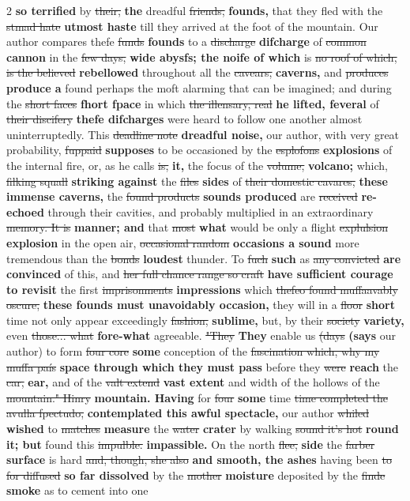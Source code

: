 \documentclass[10pt]{article}
\begin{document}
\begin{multicols}{2}
\textbf{so terrified} by \sout{their,} \textbf{the} dreadful \sout{friends,} \textbf{founds,} that they fled with the \sout{stmad hate} \textbf{utmost haste} till they arrived at the foot of the mountain. Our author compares thefe \sout{funds} \textbf{founds} to a \sout{discharge} \textbf{difcharge} of \sout{common} \textbf{cannon} in the \sout{few days,} \textbf{wide abysfs; the noife of which} is \sout{no roof of which, is the believed} \textbf{rebellowed} throughout all the \sout{cavears,} \textbf{caverns,} and \sout{produces} \textbf{produce a} found perhaps the moft alarming that can be imagined; and during the \sout{short faces} \textbf{fhort fpace} in which \sout{the illensary, real} \textbf{he lifted, feveral} of \sout{their discifery} \textbf{thefe difcharges} were heard to follow one another almost uninterruptedly. This \sout{deadline note} \textbf{dreadful noise,} our author, with very great probability, \sout{fuppaid} \textbf{supposes} to be occasioned by the \sout{esplofons} \textbf{explosions} of the internal fire, or, as he calls \sout{is,} \textbf{it,} the focus of the \sout{volume,} \textbf{volcano;} which, \sout{filking squall} \textbf{striking against} the \sout{files} \textbf{sides} of \sout{their domestic cavares,} \textbf{these immense caverns,} the \sout{found products} \textbf{sounds produced} are \sout{received} \textbf{re-echoed} through their cavities, and probably multiplied in an extraordinary \sout{memory. It is} \textbf{manner; and} that \sout{most} \textbf{what} would be only a flight \sout{explulsion} \textbf{explosion} in the open air, \sout{occasional random} \textbf{occasions a sound} more tremendous than the \sout{bonds} \textbf{loudest} thunder. To \sout{fuch} \textbf{such} as \sout{any convicted} \textbf{are convinced} of this, and \sout{her full chance range so craft} \textbf{have sufficient courage to revisit} the first \sout{imprisonments} \textbf{impressions} which \sout{thefeo found muffaavably oscure,} \textbf{these founds must unavoidably occasion,} they will in a \sout{floor} \textbf{short} time not only appear exceedingly \sout{fashion,} \textbf{sublime,} but, by their \sout{society} \textbf{variety,} even \sout{those... what} \textbf{fore-what} agreeable. \sout{"They} \textbf{They} enable us \sout{(days} \textbf{(says} our author) to form \sout{four core} \textbf{some} conception of the \sout{fascination which, why my muffa país} \textbf{space through which they must pass} before they \sout{were} \textbf{reach} the \sout{car,} \textbf{ear,} and of the \sout{valt extend} \textbf{vast extent} and width of the hollows of the \sout{mountain." Hinry} \textbf{mountain. Having} for \sout{four} \textbf{some} time \sout{time completed the avulla fpectudo,} \textbf{contemplated this awful spectacle,} our author \sout{whiled} \textbf{wished} to \sout{matches} \textbf{measure} the \sout{water} \textbf{crater} by walking \sout{sound it’s hot} \textbf{round it; but} found this \sout{impulble.} \textbf{impassible.} On the north \sout{flee,} \textbf{side} the \sout{farber} \textbf{surface} is hard \sout{and, though, she also} \textbf{and smooth, the ashes} having been \sout{to for diffused} \textbf{so far dissolved} by the \sout{mother} \textbf{moisture} deposited by the \sout{finde} \textbf{smoke} as to cement into one 
\end{multicols}
\end{document}
